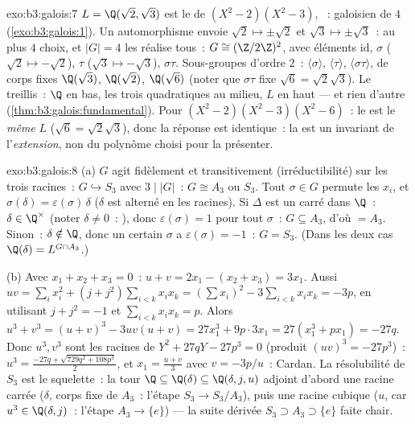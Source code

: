 \begin{solution}{exo:b3:galois:7}
$L = \Q(\sqrt2, \sqrt3)$ est le  de
$(X^2-2)(X^2-3)$, ~: galoisien de  $4$
(\cref{exo:b3:galois:1}). Un automorphisme envoie $\sqrt2
\mapsto \pm\sqrt2$ et $\sqrt3 \mapsto \pm\sqrt3$~: au plus $4$
choix, et $|G| = 4$ les réalise tous~: $G \cong (\Z/2\Z)^2$,
avec éléments $\mathrm{id}$, $\sigma$ ($\sqrt2 \mapsto
-\sqrt2$), $\tau$ ($\sqrt3 \mapsto -\sqrt3$), $\sigma\tau$.
Sous-groupes d'ordre $2$~: $\langle\sigma\rangle$,
$\langle\tau\rangle$, $\langle\sigma\tau\rangle$, de corps
fixes $\Q(\sqrt3)$, $\Q(\sqrt2)$, $\Q(\sqrt6)$ (noter que
$\sigma\tau$ fixe $\sqrt6 = \sqrt2\sqrt3$). Le treillis~: $\Q$
en bas, les trois quadratiques au milieu, $L$ en haut --- et
rien d'autre (\cref{thm:b3:galois:fundamental}). Pour
$(X^2-2)(X^2-3)(X^2-6)$~: le  est le
\emph{même} $L$ ($\sqrt6 = \sqrt2\sqrt3$), donc la réponse est
identique~: la  est un invariant de
l'\emph{extension}, non du polynôme choisi pour la présenter.
\end{solution}

\begin{solution}{exo:b3:galois:8}
(a) $G$ agit fidèlement et transitivement (irréductibilité) sur
les trois racines~: $G \hookrightarrow S_3$ avec $3 \mid |G|$~:
$G \cong A_3$ ou $S_3$. Tout $\sigma \in G$ permute les $x_i$,
et $\sigma(\delta) = \varepsilon(\sigma)\,\delta$ ($\delta$ est
alterné en les racines). Si $\Delta$ est un carré dans $\Q$~:
$\delta \in \Q^\times$ (noter $\delta \neq 0$~: ),
donc $\varepsilon(\sigma) = 1$ pour tout $\sigma$~: $G
\subseteq A_3$, d'où $= A_3$. Sinon~: $\delta \notin \Q$, donc
un certain $\sigma$ a $\varepsilon(\sigma) = -1$~: $G = S_3$.
(Dans les deux cas $\Q(\delta) = L^{G \cap A_3}$.)

(b) Avec $x_1 + x_2 + x_3 = 0$~: $u + v = 2x_1 - (x_2 + x_3) =
3x_1$. Aussi $uv = \sum_i x_i^2 + (j+j^2)\sum_{i<k}x_ix_k =
(\sum x_i)^2 - 3\sum_{i<k}x_ix_k = -3p$, en utilisant $j + j^2
= -1$ et $\sum_{i<k}x_ix_k = p$. Alors $u^3 + v^3 = (u+v)^3 -
3uv(u+v) = 27x_1^3 + 9p\cdot 3x_1 = 27(x_1^3 + px_1) = -27q$.
Donc $u^3, v^3$ sont les racines de $Y^2 + 27qY - 27p^3 = 0$
(produit $(uv)^3 = -27p^3$)~: $u^3 = \frac{-27q +
\sqrt{729q^2 + 108p^3}}{2}$, et $x_1 = \frac{u+v}{3}$ avec $v
= -3p/u$~: Cardan. La résolubilité de $S_3$ est le squelette~:
la tour $\Q \subseteq \Q(\delta) \subseteq \Q(\delta, j, u)$
adjoint d'abord une racine carrée ($\delta$, corps fixe de
$A_3$~: l'étape $S_3 \to S_3/A_3$), puis une racine cubique
($u$, car $u^3 \in \Q(\delta, j)$~: l'étape $A_3 \to \{e\}$)
--- la suite dérivée $S_3 \supset A_3 \supset \{e\}$ faite
chair.
\end{solution}

